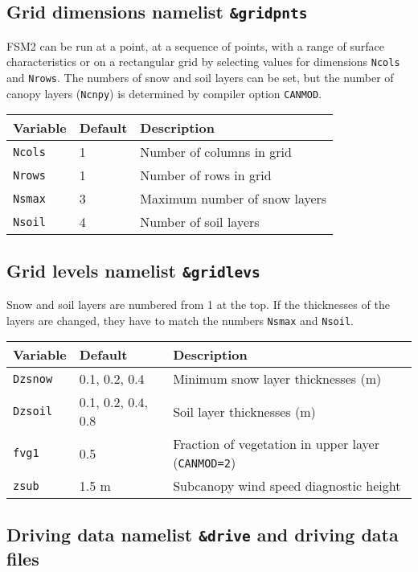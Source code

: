 \documentclass{article}
\begin{document}
\subsection{Grid dimensions namelist {\tt \&gridpnts}}
FSM2 can be run at a point, at a sequence of points, with a range of surface characteristics or on a rectangular grid by selecting values for dimensions {\tt Ncols} and {\tt Nrows}. The numbers of snow and soil layers can be set, but the number of canopy layers ({\tt Ncnpy}) is determined by compiler option {\tt CANMOD}.

\begin{longtable}{|l|l|l|}
\hline
Variable & Default & Description \\ \hline
{\tt Ncols}      & 1    & Number of columns in grid      \\
{\tt Nrows}      & 1    & Number of rows in grid         \\
{\tt Nsmax}      & 3    & Maximum number of snow layers  \\
{\tt Nsoil}      & 4    & Number of soil layers          \\ \hline
\end{longtable}

\subsection{Grid levels namelist {\tt \&gridlevs}}
Snow and soil layers are numbered from 1 at the top. If the thicknesses of the layers are changed, they have to match the numbers {\tt Nsmax} and {\tt Nsoil}. 

\begin{longtable}{|l|l|l|}
\hline
Variable & Default & Description \\ \hline
{\tt Dzsnow}      & 0.1, 0.2, 0.4       & Minimum snow layer thicknesses (m)  \\
{\tt Dzsoil}      & 0.1, 0.2, 0.4, 0.8  & Soil layer thicknesses (m)          \\ 
{\tt fvg1}        & 0.5                 & Fraction of vegetation in upper layer ({\tt CANMOD=2}) \\
{\tt zsub}        & 1.5 m               & Subcanopy wind speed diagnostic height  \\ \hline
\end{longtable}

\subsection{Driving data namelist {\tt \&drive} and driving data files}
\end{document}
